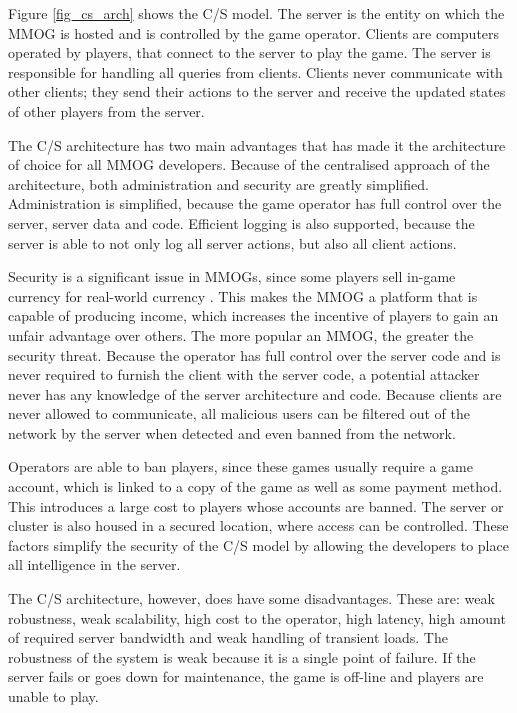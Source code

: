 Figure \ref{fig_cs_arch} shows the C/S model. The server is the entity on which the MMOG is hosted and is controlled by the game operator.
Clients are computers operated by players, that connect to the server to play the game. The server is responsible for handling all queries from
clients. Clients never communicate with other clients; they send their actions to the server and receive the updated states of other players from the
server.

The C/S architecture has two main advantages that has made it the architecture of choice for all MMOG developers. Because of the centralised approach
of the architecture, both administration and security are greatly simplified. Administration is simplified, because the game operator has full
control over the server, server data and code. Efficient logging is also supported, because the server is able to not only log all server actions,
but also all client actions.

Security is a significant issue in MMOGs, since some players sell in-game currency for real-world currency \cite{chinese_gold_farmer}. This makes the
MMOG a platform that is capable of producing income, which increases the incentive of players to gain an unfair advantage over others. The more
popular an MMOG, the greater the security threat. Because the operator has full control over the server code and is never required to furnish the
client with the server code, a potential attacker never has any knowledge of the server architecture and code. Because clients are never allowed to
communicate, all malicious users can be filtered out of the network by the server when detected and even banned from the network.

Operators are able to ban players, since these games usually require a game account, which is linked to a copy of the game as well as some payment
method. This introduces a large cost to players whose accounts are banned. The server or cluster is also housed in a secured location, where access
can be controlled. These factors simplify the security of the C/S model by allowing the developers to place all intelligence in the server.

The C/S architecture, however, does have some disadvantages. These are: weak robustness, weak scalability, high cost to the operator, high
latency, high amount of required server bandwidth and weak handling of transient loads. The robustness of the system is weak because it is
a single point of failure. If the server fails or goes down for maintenance, the game is off-line
and players are unable to play.

